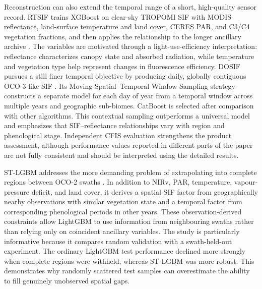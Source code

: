 Reconstruction can also extend the temporal range of a short, high-quality sensor record. RTSIF trains XGBoost on clear-sky TROPOMI SIF with MODIS reflectance, land-surface temperature and land cover, CERES PAR, and C3/C4 vegetation fractions, and then applies the relationship to the longer ancillary archive \cite{chen2022long}. The variables are motivated through a light-use-efficiency interpretation: reflectance characterizes canopy state and absorbed radiation, while temperature and vegetation type help represent changes in fluorescence efficiency. DOSIF pursues a still finer temporal objective by producing daily, globally contiguous OCO-3-like SIF \cite{yu2025dosif}. Its Moving Spatial--Temporal Window Sampling strategy constructs a separate model for each day of year from a temporal window across multiple years and geographic sub-biomes. CatBoost is selected after comparison with other algorithms. This contextual sampling outperforms a universal model and emphasizes that SIF--reflectance relationships vary with region and phenological stage. Independent CFIS evaluation strengthens the product assessment, although performance values reported in different parts of the paper are not fully consistent and should be interpreted using the detailed results.

ST-LGBM addresses the more demanding problem of extrapolating into complete regions between OCO-2 swaths \cite{shen2022spatiotemporal}. In addition to NIRv, PAR, temperature, vapour-pressure deficit, and land cover, it derives a spatial SIF factor from geographically nearby observations with similar vegetation state and a temporal factor from corresponding phenological periods in other years. These observation-derived constraints allow LightGBM to use information from neighbouring swaths rather than relying only on coincident ancillary variables. The study is particularly informative because it compares random validation with a swath-held-out experiment. The ordinary LightGBM test performance declined more strongly when complete regions were withheld, whereas ST-LGBM was more robust. This demonstrates why randomly scattered test samples can overestimate the ability to fill genuinely unobserved spatial gaps.

